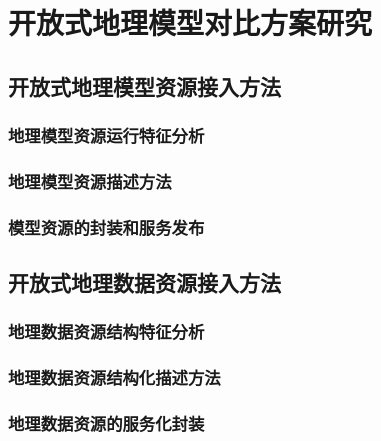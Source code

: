 \chapter{开放式地理模型对比方案研究}

\section{开放式地理模型资源接入方法}

\subsection{地理模型资源运行特征分析}

\subsection{地理模型资源描述方法}
\subsection{模型资源的封装和服务发布}

\section{开放式地理数据资源接入方法}
\subsection{地理数据资源结构特征分析}
\subsection{地理数据资源结构化描述方法}
\subsection{地理数据资源的服务化封装}


